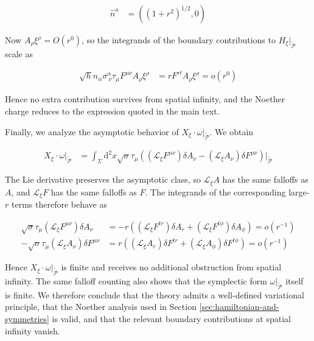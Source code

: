\begin{align}
\hat{n}^{a} & =((1+r^{2})^{1/2},0)
\end{align}

Now $A_{\rho}\xi ^{\rho}=O(r^{0})$, so the integrands of the boundary contributions to $H_{\xi}|_{\widetilde{\mathcal{P}}}$ scale as

\begin{align}
\sqrt{ h }\hat{n}_{\alpha}\sigma ^{\alpha}_{~\nu}\tau _{\mu}F^{\mu \nu}A_{\rho}\xi ^{\rho}
&=rF^{rt}A_{\rho}\xi ^{\rho}=o(r^{0})
\end{align}

Hence no extra contribution survives from spatial infinity, and the Noether charge reduces to the expression quoted in the main text.

Finally, we analyze the asymptotic behavior of $X_{\xi}\cdot \omega |_{\widetilde{\mathcal{P}}}$. We obtain

\begin{align}
X_{\xi}\cdot \omega |_{\widetilde{\mathcal{P}}}
&=\int _{\Sigma}\mathrm{d}^{2}x\sqrt{ \sigma }\tau _{\mu}\left((\mathcal{L}_{\xi}F^{\mu \nu})\delta A_{\nu}-(\mathcal{L}_{\xi}A_{\nu})\delta F^{\mu \nu}\right)\Big|_{\widetilde{\mathcal{P}}}
\end{align}

The Lie derivative preserves the asymptotic class, so $\mathcal{L}_{\xi}A$ has the same falloffs as $A$, and $\mathcal{L}_{\xi}F$ has the same falloffs as $F$. The integrands of the corresponding large-$r$ terms therefore behave as

\begin{align}
\sqrt{ \sigma }\tau _{\mu}(\mathcal{L}_{\xi}F^{\mu \nu})\delta A_{\nu}
&=-r\left((\mathcal{L}_{\xi}F^{tr})\delta A_{r}+(\mathcal{L}_{\xi}F^{t\phi})\delta A_{\phi}\right)=o(r^{-1}) \\
-\sqrt{ \sigma }\tau _{\mu}(\mathcal{L}_{\xi}A_{\nu})\delta F^{\mu \nu}
&=r\left((\mathcal{L}_{\xi}A_{r})\delta F^{tr}+(\mathcal{L}_{\xi}A_{\phi})\delta F^{t\phi}\right)=o(r^{-1})
\end{align}

Hence $X_{\xi}\cdot \omega |_{\widetilde{\mathcal{P}}}$ is finite and receives no additional obstruction from spatial infinity. The same falloff counting also shows that the symplectic form $\omega |_{\widetilde{\mathcal{P}}}$ itself is finite. We therefore conclude that the theory admits a well-defined variational principle, that the Noether analysis used in Section \ref{sec:hamiltonian-and-symmetries} is valid, and that the relevant boundary contributions at spatial infinity vanish.
